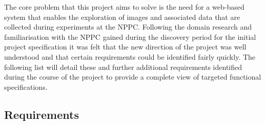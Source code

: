 

The core problem that this project aims to solve is the need for a web-based system that enables the exploration of images and associated data that are collected during experiments at the NPPC. Following the domain research and familiarisation with the NPPC gained during the discovery period for the initial project specification it was felt that the new direction of the project was well understood and that certain requirements could be identified fairly quickly. The following list will detail these and further additional requirements identified during the course of the project to provide a complete view of targeted functional specifications.

\subsection{Requirements}

